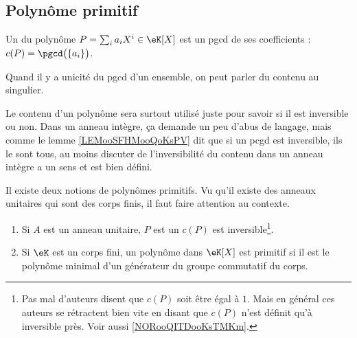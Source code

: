 \subsection{Polynôme primitif}

\begin{definition}\label{DefContenuPolynome}
	Un  du polynôme \( P=\sum_ia_iX^i\in\eK[X]\) est un pgcd de ses coefficients : \( c(P)=\pgcd\big(\{ a_i \}\big)\).
\end{definition}

\begin{normaltext}		\label{NORooQITDooKsTMKm}
	Quand il y a unicité du pgcd d'un ensemble, on peut parler du contenu au singulier.

	Le contenu d'un polynôme sera surtout utilisé juste pour savoir si il est inversible ou non. Dans un anneau intègre, ça demande un peu d'abus de langage, mais comme le lemme \ref{LEMooSFHMooQoKsPV} dit que si un pcgd est inversible, ils le sont tous, au moins discuter de l'inversibilité du contenu dans un anneau intègre a un sens et est bien défini.
\end{normaltext}

\begin{definition}           \label{DEFooDVOOooKaPZQC} \label{DEFooAIYGooRAEfHU}
	Il existe deux notions de polynômes primitifs. Vu qu'il existe des anneaux unitaires qui sont des corps finis, il faut faire attention au contexte.
	\begin{enumerate}
		\item
		      Si \( A\) est un anneau unitaire, \( P\) est un  \( c(P) \) est inversible\footnote{Pas mal d'auteurs disent que \( c(P)\) soit être égal à \( 1\). Mais en général ces auteurs se rétractent bien vite en disant que \( c(P)\) n'est définit qu'à inversible près. Voir aussi \ref{NORooQITDooKsTMKm}.}.
		\item
		      Si \( \eK\) est un corps fini, un polynôme dans \( \eK[X]\) est primitif si il est le polynôme minimal d'un générateur du groupe commutatif du corps.
	\end{enumerate}
\end{definition}


